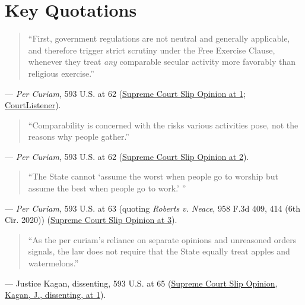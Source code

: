 \documentclass[12pt]{article}
\begin{document}
\section{Key Quotations}
\begin{quote}
``First, government regulations are not neutral and generally applicable, and therefore trigger strict scrutiny under the Free Exercise Clause, whenever they treat \textit{any} comparable secular activity more favorably than religious exercise.''
\end{quote}
\noindent --- \textit{Per Curiam}, 593 U.S. at 62 (\href{https://www.supremecourt.gov/opinions/20pdf/20a151_4g15.pdf}{Supreme Court Slip Opinion at 1}; \href{https://www.courtlistener.com/opinion/4872486/tandon-v-newsom/}{CourtListener}).

\begin{quote}
``Comparability is concerned with the risks various activities pose, not the reasons why people gather.''
\end{quote}
\noindent --- \textit{Per Curiam}, 593 U.S. at 62 (\href{https://www.supremecourt.gov/opinions/20pdf/20a151_4g15.pdf}{Supreme Court Slip Opinion at 2}).

\begin{quote}
``The State cannot `assume the worst when people go to worship but assume the best when people go to work.' ''
\end{quote}
\noindent --- \textit{Per Curiam}, 593 U.S. at 63 (quoting \textit{Roberts v. Neace}, 958 F.3d 409, 414 (6th Cir. 2020)) (\href{https://www.supremecourt.gov/opinions/20pdf/20a151_4g15.pdf}{Supreme Court Slip Opinion at 3}).

\begin{quote}
``As the per curiam's reliance on separate opinions and unreasoned orders signals, the law does not require that the State equally treat apples and watermelons.''
\end{quote}
\noindent --- Justice Kagan, dissenting, 593 U.S. at 65 (\href{https://www.supremecourt.gov/opinions/20pdf/20a151_4g15.pdf}{Supreme Court Slip Opinion, Kagan, J., dissenting, at 1}).
\end{document}
